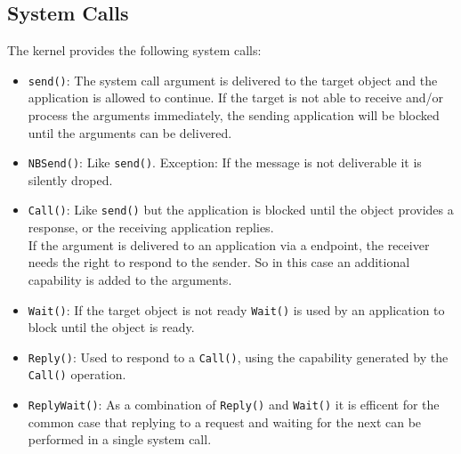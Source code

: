 \subsection{System Calls}
The kernel provides the following system calls:
\begin{itemize}
\item \texttt{send()}: The system call argument is delivered to the target object and the application is allowed to continue. If the target is not able to receive and/or process the arguments immediately, the sending application will be blocked until the arguments can be delivered.

\item \texttt{NBSend()}: Like \texttt{send()}. Exception: If the message is not deliverable it is silently droped.
\item \texttt{Call()}: Like \texttt{send()} but the application is blocked until the object provides a response, or the receiving application replies. \\
If the argument is delivered to an application via a endpoint, the receiver needs the right to respond to the sender. So in this case an additional capability is added to the arguments. 
\item \texttt{Wait()}: If the target object is not ready \texttt{Wait()} is used by an application to block until the object is ready. 
\item \texttt{Reply()}: Used to respond to a \texttt{Call()}, using the capability generated by the \texttt{Call()} operation.
\item \texttt{ReplyWait()}: As a combination of \texttt{Reply()} and \texttt{Wait()} it is efficent for the common case that replying to a request and waiting for the next can be performed in a single system call. 
\end{itemize}
	
